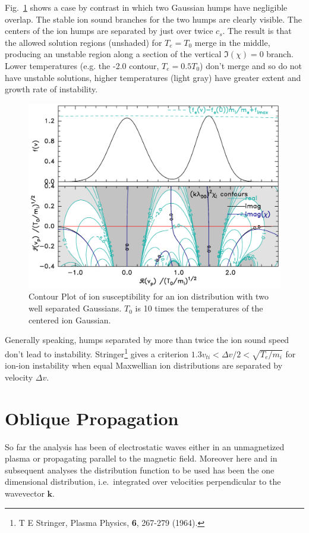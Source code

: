 \documentclass[12pt]{article}
\begin{document}
Fig.\ \ref{separatehumps} shows a case by contrast in which two
Gaussian humps have negligible overlap.
The stable ion sound branches for the two humps are clearly visible.
The centers of the ion humps are separated by just over twice
$c_s$. The result is that the allowed solution regions (unshaded) for
$T_e=T_0$ merge in the middle, producing an unstable region along a
section of the vertical $\Im(\chi)=0$ branch. Lower temperatures
(e.g. the -2.0 contour, $T_e=0.5T_0$) don't merge and so do not have
unstable solutions, higher temperatures (light gray) have greater
extent and growth rate of instability.
\begin{figure}[htp]
  \center\includegraphics[width=0.7\hsize]{twonarrowgauss}\endcenter
  \caption{Contour Plot of ion susceptibility for an ion distribution
    with two well separated Gaussians. $T_0$ is 10 times the
    temperatures of the centered ion Gaussian. \label{separatehumps}}
\end{figure}
Generally speaking, humps separated by more than twice the ion sound speed
don't lead to instability. Stringer\footnote{T E Stringer, Plasma
  Physics, {\bf 6}, 267-279 (1964).} gives a criterion $1.3 v_{ti}<
\Delta v/2 < \sqrt{T_e/m_i}$ for ion-ion instability when equal
Maxwellian ion distributions are separated by velocity $\Delta v$.

\section{Oblique Propagation}

So far the analysis has been of electrostatic waves either in an
unmagnetized plasma or propagating parallel to the magnetic field.
Moreover here and in subsequent analyses the distribution function to
be used has been the one dimensional distribution, i.e.\ integrated
over velocities perpendicular to the wavevector $\bm k$.  
\end{document}
